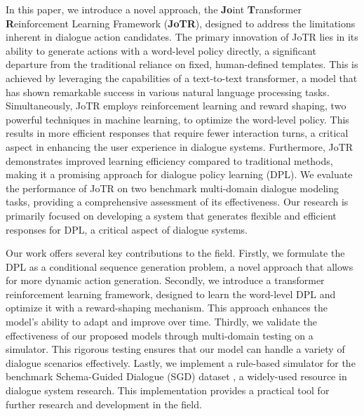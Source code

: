 \documentclass[letterpaper]{article} %
\begin{document}
In this paper, we introduce a novel approach, the \textbf{Jo}int \textbf{T}ransformer \textbf{R}einforcement Learning Framework (\textbf{JoTR}), designed to address the limitations inherent in dialogue action candidates. The primary innovation of JoTR lies in its ability to generate actions with a word-level policy directly, a significant departure from the traditional reliance on fixed, human-defined templates. This is achieved by leveraging the capabilities of a text-to-text transformer, a model that has shown remarkable success in various natural language processing tasks. Simultaneously, JoTR employs reinforcement learning and reward shaping, two powerful techniques in machine learning, to optimize the word-level policy. This results in more efficient responses that require fewer interaction turns, a critical aspect in enhancing the user experience in dialogue systems. Furthermore, JoTR demonstrates improved learning efficiency compared to traditional methods, making it a promising approach for dialogue policy learning (DPL). We evaluate the performance of JoTR on two benchmark multi-domain dialogue modeling tasks, providing a comprehensive assessment of its effectiveness. Our research is primarily focused on developing a system that generates flexible and efficient responses for DPL, a critical aspect of dialogue systems. 

Our work offers several key contributions to the field. Firstly, we formulate the DPL as a conditional sequence generation problem, a novel approach that allows for more dynamic action generation. Secondly, we introduce a transformer reinforcement learning framework, designed to learn the word-level DPL and optimize it with a reward-shaping mechanism. This approach enhances the model's ability to adapt and improve over time. Thirdly, we validate the effectiveness of our proposed models through multi-domain testing on a simulator. This rigorous testing ensures that our model can handle a variety of dialogue scenarios effectively. Lastly, we implement a rule-based simulator for the benchmark Schema-Guided Dialogue (SGD) dataset \cite{rastogi2020towards}, a widely-used resource in dialogue system research. This implementation provides a practical tool for further research and development in the field.
\end{document}
